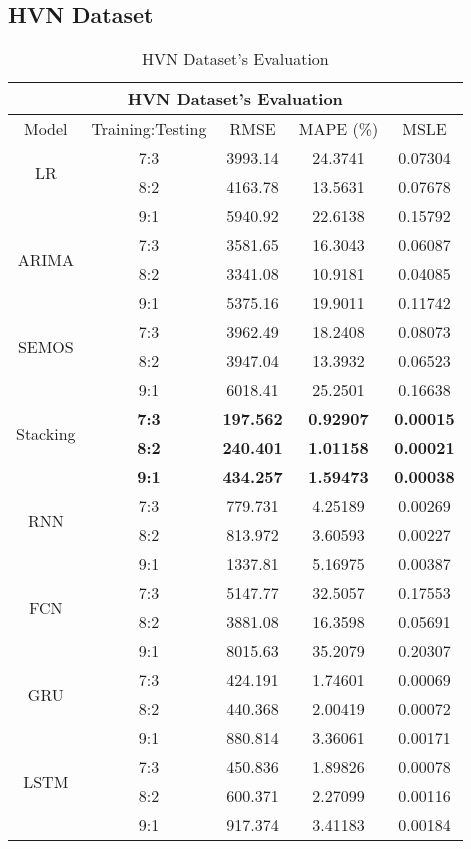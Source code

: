 \documentclass{ieeeojies}
\begin{document}
\subsection{HVN Dataset} 
\begin{table}[H]
    \centering
    \begin{tabular}{|c|c|c|c|c|}
         \hline
         \multicolumn{5}{|c|}{\textbf{HVN Dataset's Evaluation}}\\
         \hline
         \centering Model & Training:Testing & RMSE & MAPE (\%) & MSLE\\
         \hline
         \multirow{2}{*}{LR} & 7:3 & 3993.14 & 24.3741 & 0.07304 \\ & 8:2 & 4163.78 & 13.5631 & 0.07678 \\ & 9:1 & 5940.92 & 22.6138 & 0.15792\\
         \hline
         \multirow{2}{*}{ARIMA} & 7:3&3581.65&16.3043&0.06087\\ & 8:2&3341.08&10.9181&0.04085 \\ & 9:1 & 5375.16 & 19.9011 &0.11742\\
         \hline
         \multirow{2}{*}{SEMOS} & 7:3 & 3962.49 & 18.2408 & 0.08073 \\ & 8:2 & 3947.04 & 13.3932 & 0.06523 \\ & 9:1 & 6018.41  & 25.2501 & 0.16638\\
         \hline
         \multirow{2}{*}{Stacking} & \textbf{7:3} &  \textbf{197.562} & \textbf{0.92907} & \textbf{0.00015} \\ & \textbf{8:2} & \textbf{240.401} & \textbf{1.01158} & \textbf{0.00021} \\ & \textbf{9:1} & \textbf{434.257}  & \textbf{1.59473} & \textbf{0.00038}\\
         \hline
         \multirow{2}{*}{RNN} & 7:3	& 779.731 & 4.25189 & 0.00269 \\ & 8:2 & 813.972 & 3.60593 & 0.00227 \\ & 9:1 & 1337.81  & 5.16975 & 0.00387\\
         \hline
         \multirow{2}{*}{FCN} & 7:3 & 5147.77 & 32.5057 & 0.17553 \\ & 8:2 &	3881.08 & 16.3598 & 0.05691 \\ & 9:1 & 8015.63	& 35.2079 & 0.20307\\
         \hline
         \multirow{2}{*}{GRU} & 7:3 & 424.191 & 1.74601& 0.00069 \\ & 8:2 & 440.368 & 2.00419 & 0.00072 \\ & 9:1 &  880.814 & 3.36061 & 0.00171 \\
         \hline
         \multirow{2}{*}{LSTM} & 7:3 & 450.836 &  1.89826 &  0.00078 \\ & 8:2 & 600.371 &  2.27099 &  0.00116 \\ & 9:1 & 917.374 & 3.41183 & 0.00184\\
         \hline
    \end{tabular}
    \caption{HVN Dataset's Evaluation}
    \label{vcbresult}
\end{table}
\end{document}
